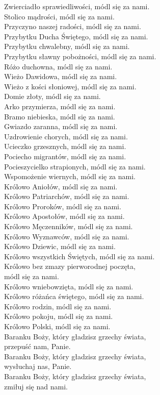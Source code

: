 ﻿\documentclass[9pt,twoside]{extarticle}
\begin{document}
Zwierciadło sprawiedliwości, \hfill módl się za nami.\\
Stolico mądrości, \hfill módl się za nami.\\
Przyczyno naszej radości, \hfill módl się za nami.\\
Przybytku Ducha Świętego, \hfill módl się za nami.\\
Przybytku chwalebny, \hfill módl się za nami.\\
Przybytku sławny pobożności, \hfill módl się za nami.\\
Różo duchowna, \hfill módl się za nami.\\
Wieżo Dawidowa, \hfill módl się za nami.\\
Wieżo z kości słoniowej, \hfill módl się za nami.\\
Domie złoty, \hfill módl się za nami.\\
Arko przymierza, \hfill módl się za nami.\\
Bramo niebieska, \hfill módl się za nami.\\
Gwiazdo zaranna, \hfill módl się za nami.\\
Uzdrowienie chorych, \hfill módl się za nami.\\
Ucieczko grzesznych, \hfill módl się za nami.\\
Pociecho migrantów, \hfill módl się za nami.\\
Pocieszycielko strapionych, \hfill módl się za nami.\\
Wspomożenie wiernych, \hfill módl się za nami.\\
Królowo Aniołów, \hfill módl się za nami.\\
Królowo Patriarchów, \hfill módl się za nami.\\
Królowo Proroków, \hfill módl się za nami.\\
Królowo Apostołów, \hfill módl się za nami.\\
Królowo Męczenników, \hfill módl się za nami.\\
Królowo Wyznawców, \hfill módl się za nami.\\
Królowo Dziewic, \hfill módl się za nami.\\
Królowo wszystkich Świętych, \hfill módl się za nami.\\
Królowo bez zmazy pierworodnej poczęta, \\ \null\hfill módl się za nami.\\
Królowo wniebowzięta, \hfill módl się za nami.\\
Królowo różańca świętego, \hfill módl się za nami.\\
Królowo rodzin, \hfill módl się za nami.\\
Królowo pokoju, \hfill módl się za nami.\\
Królowo Polski, \hfill módl się za nami.\\
Baranku Boży, który gładzisz grzechy świata, \\ \null\hfill przepuść nam, Panie.\\
Baranku Boży, który gładzisz grzechy świata, \\ \null\hfill wysłuchaj nas, Panie.\\
Baranku Boży, który gładzisz grzechy świata, \\ \null\hfill zmiłuj się nad nami.
\end{document}
